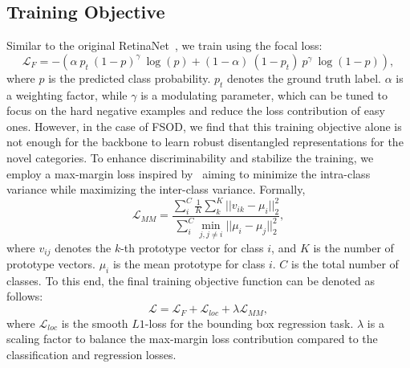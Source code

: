 \documentclass[10pt,twocolumn,letterpaper]{article}
\begin{document}
\subsection{Training Objective}

Similar to the original RetinaNet~\cite{RetinaNet}, we train using the focal loss:
\begin{equation}
    \mathcal{L}_F = - (\alpha~p_t~(1-p)^\gamma~\log(p) + (1-\alpha)~(1-p_t)~p^\gamma~\log(1-p)),
\end{equation}
where $p$ is the predicted class probability. $p_t$ denotes the ground truth label. $\alpha$ is a weighting factor, while $\gamma$ is a modulating parameter, which can be tuned to focus on the hard negative examples and reduce the loss contribution of easy ones. However, in the case of FSOD, we find that this training objective alone is not enough for the backbone to learn robust disentangled representations for the novel categories. To enhance discriminability and stabilize the training, we employ a max-margin loss inspired by~\cite{CME} aiming to minimize the intra-class variance while maximizing the inter-class variance. Formally, 
\begin{equation}
    \mathcal{L}_{MM} = \frac{ \sum_i^C \frac{1}{K} \sum_k^K ||v_{ik} - \mu_i||_2^2}{\sum_i^C \min_{j,j \neq i} ||\mu_i - \mu_j||_2^2},
\end{equation}
where $v_{ij}$ denotes the $k$-th prototype vector for class $i$, and $K$ is the number of prototype vectors. $\mu_i$ is the mean prototype for class $i$. $C$ is the total number of classes. To this end, the final training objective function can be denoted as follows:
\begin{equation}
    \mathcal{L} = \mathcal{L}_{F} + \mathcal{L}_{loc} + \lambda \mathcal{L}_{MM}, 
\end{equation}
where $\mathcal{L}_{loc}$ is the smooth $L1$-loss for the bounding box regression task. $\lambda$ is a scaling factor to balance the max-margin loss contribution compared to the classification and regression losses.
\end{document}
